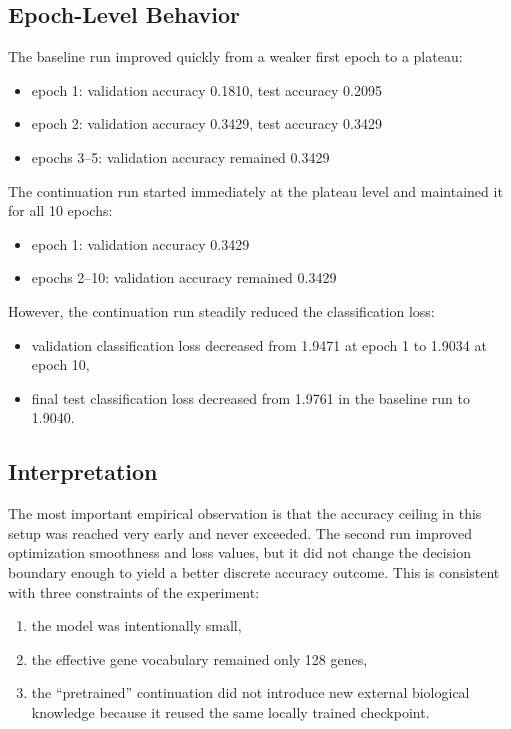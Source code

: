 \documentclass[11pt]{article}
\begin{document}
\subsection{Epoch-Level Behavior}
The baseline run improved quickly from a weaker first epoch to a plateau:
\begin{itemize}
    \item epoch 1: validation accuracy 0.1810, test accuracy 0.2095
    \item epoch 2: validation accuracy 0.3429, test accuracy 0.3429
    \item epochs 3--5: validation accuracy remained 0.3429
\end{itemize}

The continuation run started immediately at the plateau level and maintained it for all 10 epochs:
\begin{itemize}
    \item epoch 1: validation accuracy 0.3429
    \item epochs 2--10: validation accuracy remained 0.3429
\end{itemize}

However, the continuation run steadily reduced the classification loss:
\begin{itemize}
    \item validation classification loss decreased from 1.9471 at epoch 1 to 1.9034 at epoch 10,
    \item final test classification loss decreased from 1.9761 in the baseline run to 1.9040.
\end{itemize}

\subsection{Interpretation}
The most important empirical observation is that the accuracy ceiling in this setup was reached very early and never exceeded. The second run improved optimization smoothness and loss values, but it did not change the decision boundary enough to yield a better discrete accuracy outcome. This is consistent with three constraints of the experiment:
\begin{enumerate}
    \item the model was intentionally small,
    \item the effective gene vocabulary remained only 128 genes,
    \item the ``pretrained'' continuation did not introduce new external biological knowledge because it reused the same locally trained checkpoint.
\end{enumerate}
\end{document}
